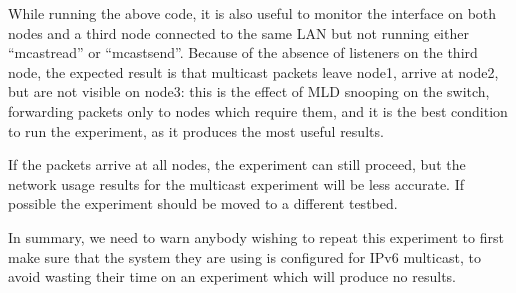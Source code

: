 \documentclass[a4paper,11pt,twocolumn]{article}
\begin{document}
While running the above code, it is also useful to monitor the interface
on both nodes and a third node connected to the same LAN but not running
either ``mcastread'' or ``mcastsend''.  Because of the absence of
listeners on the third node, the expected result is that multicast
packets leave node1, arrive at node2, but are not visible on node3:
this is the effect of MLD snooping on the switch, forwarding packets
only to nodes which require them, and it is the best condition to
run the experiment, as it produces the most useful results.

If the packets arrive at all nodes, the experiment can still proceed,
but the network usage results for the multicast experiment will be less
accurate.  If possible the experiment should be moved to a different
testbed.

In summary, we need to warn anybody wishing to repeat this experiment
to first make sure that the system they are using is configured for
IPv6 multicast, to avoid wasting their time on an experiment which will
produce no results.
\end{document}
